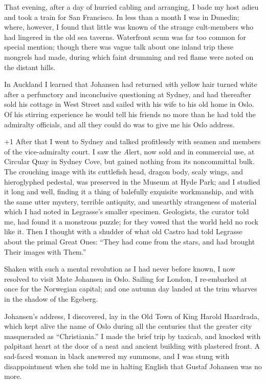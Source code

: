 That evening, after a day of hurried cabling and arranging, I bade my host adieu and took a train for San Francisco. In less than a month I was in Dunedin; where, however, I found that little was known of the strange cult-members who had lingered in the old sea taverns. Waterfront scum was far too common for special mention; though there was vague talk about one inland trip these mongrels had made, during which faint drumming and red flame were noted on the distant hills.

In Auckland I learned that Johansen had returned {\emph with yellow hair turned white} after a perfunctory and inconclusive questioning at Sydney, and had thereafter sold his cottage in West Street and sailed with his wife to his old home in Oslo. Of his stirring experience he would tell his friends no more than he had told the admiralty officials, and all they could do was to give me his Oslo address.

\looseness+1
After that I went to Sydney and talked profitlessly with seamen and members of the vice-admiralty court. I saw the {\emph Alert}, now sold and in commercial use, at Circular Quay in Sydney Cove, but gained nothing from its noncommittal bulk. The crouching image with its cuttlefish head, dragon body, scaly wings, and hieroglyphed pedestal, was preserved in the Museum at Hyde Park; and I studied it long and well, finding it a thing of balefully exquisite workmanship, and with the same utter mystery, terrible antiquity, and unearthly strangeness of material which I had noted in Legrasse’s smaller specimen. Geologists, the curator told me, had found it a monstrous puzzle; for they vowed that the world held no rock like it. Then I thought with a shudder of what old Castro had told Legrasse about the primal Great Ones: “They had come from the stars, and had brought Their images with Them.”

Shaken with such a mental revolution as I had never before known, I now resolved to visit Mate Johansen in Oslo. Sailing for London, I re-embarked at once for the Norwegian capital; and one autumn day landed at the trim wharves in the shadow of the Egeberg.

Johansen’s address, I discovered, lay in the Old Town of King Harold Haardrada, which kept alive the name of Oslo during all the centuries that the greater city masqueraded as “Christiania.” I made the brief trip by taxicab, and knocked with palpitant heart at the door of a neat and ancient building with plastered front. A sad-faced woman in black answered my summons, and I was stung with disappointment when she told me in halting English that Gustaf Johansen was no more.

